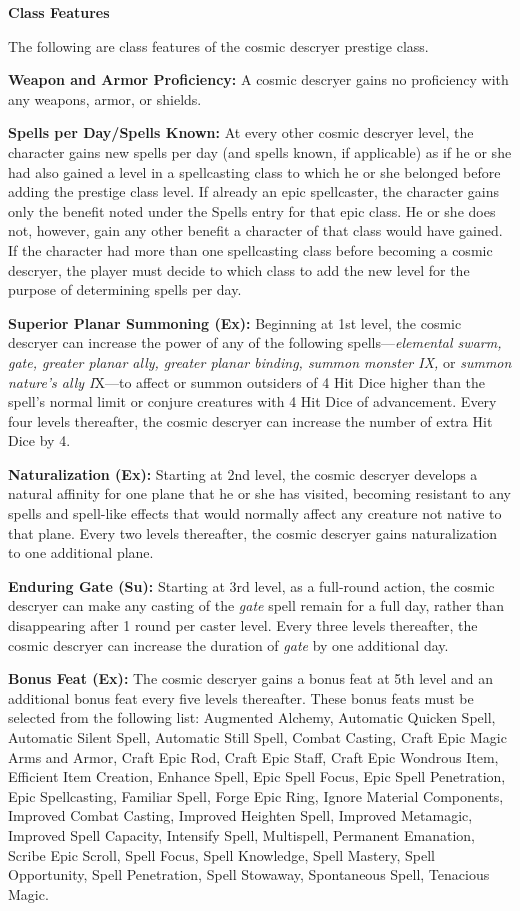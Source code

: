 \documentclass{article}
\begin{document}
\vspace{12pt}
\textbf{Class Features}

The following are class features of the cosmic descryer prestige class. 

\textbf{Weapon and Armor Proficiency:} A cosmic descryer gains no proficiency with 
any weapons, armor, or shields. 

\textbf{Spells per Day/Spells Known:} At every other cosmic descryer level, the 
character gains new spells per day (and spells known, if applicable) as if he or 
she had also gained a level in a spellcasting class to which he or she belonged 
before adding the prestige class level. If already an epic spellcaster, the character 
gains only the benefit noted under the Spells entry for that epic class. He or 
she does not, however, gain any other benefit a character of that class would have 
gained. If the character had more than one spellcasting class before becoming a 
cosmic descryer, the player must decide to which class to add the new level for 
the purpose of determining spells per day. 

\textbf{Superior Planar Summoning (Ex):} Beginning at 1st level, the cosmic descryer 
can increase the power of any of the following spells---\textit{elemental swarm, 
gate, greater planar ally, greater planar binding, summon monster IX, }or \textit{summon 
nature's ally I}X---to affect or summon outsiders of 4 Hit Dice higher than the 
spell's normal limit or conjure creatures with 4 Hit Dice of advancement. Every 
four levels thereafter, the cosmic descryer can increase the number of extra Hit 
Dice by 4. 

\textbf{Naturalization (Ex):} Starting at 2nd level, the cosmic descryer develops 
a natural affinity for one plane that he or she has visited, becoming resistant 
to any spells and spell-like effects that would normally affect any creature not 
native to that plane. Every two levels thereafter, the cosmic descryer gains naturalization 
to one additional plane. 

\textbf{Enduring Gate (Su):} Starting at 3rd level, as a full-round action, the 
cosmic descryer can make any casting of the \textit{gate }spell remain for a full 
day, rather than disappearing after 1 round per caster level. Every three levels 
thereafter, the cosmic descryer can increase the duration of \textit{gate }by one 
additional day. 

\textbf{Bonus Feat (Ex):} The cosmic descryer gains a bonus feat at 5th level and 
an additional bonus feat every five levels thereafter. These bonus feats must be 
selected from the following list: Augmented Alchemy, Automatic Quicken Spell, Automatic 
Silent Spell, Automatic Still Spell, Combat Casting, Craft Epic Magic Arms and 
Armor, Craft Epic Rod, Craft Epic Staff, Craft Epic Wondrous Item, Efficient Item 
Creation, Enhance Spell, Epic Spell Focus, Epic Spell Penetration, Epic Spellcasting, 
Familiar Spell, Forge Epic Ring, Ignore Material Components, Improved Combat Casting, 
Improved Heighten Spell, Improved Metamagic, Improved Spell Capacity, Intensify 
Spell, Multispell, Permanent Emanation, Scribe Epic Scroll, Spell Focus, Spell 
Knowledge, Spell Mastery, Spell Opportunity, Spell Penetration, Spell Stowaway, 
Spontaneous Spell, Tenacious Magic. 
\end{document}
